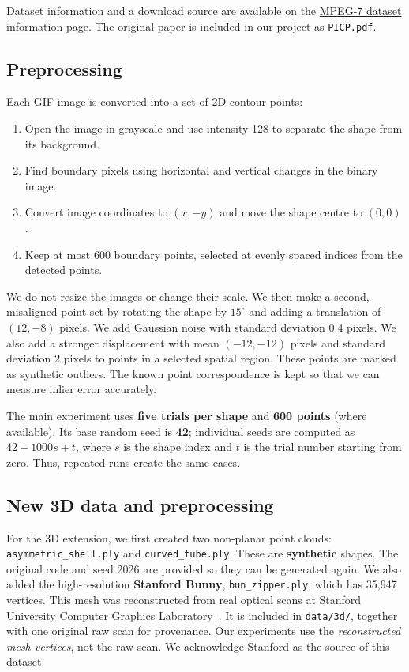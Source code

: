 \documentclass[11pt,a4paper]{article}
\begin{document}
Dataset information and a download source are available on the
\href{https://www.ehu.eus/ccwintco/index.php/MPEG-7_Core_Experiment_CE-Shape-1_Test_Set._Benchmarking_image_database_for_shape_recognition_techniques}{MPEG-7 dataset information page}.
The original paper is included in our project as \texttt{PICP.pdf}.

\subsection{Preprocessing}
Each GIF image is converted into a set of 2D contour points:
\begin{enumerate}[leftmargin=*,itemsep=2pt]
  \item Open the image in grayscale and use intensity 128 to separate the shape from its background.
  \item Find boundary pixels using horizontal and vertical changes in the binary image.
  \item Convert image coordinates to $(x,-y)$ and move the shape centre to $(0,0)$.
  \item Keep at most 600 boundary points, selected at evenly spaced indices from the detected points.
\end{enumerate}
We do not resize the images or change their scale. We then make a second,
misaligned point set by rotating the shape by $15^\circ$ and adding a translation
of $(12,-8)$ pixels. We add Gaussian noise with standard deviation 0.4 pixels.
We also add a stronger displacement with mean $(-12,-12)$ pixels and standard
deviation 2 pixels to points in a selected spatial region. These points are
marked as synthetic outliers. The known point correspondence is kept so that
we can measure inlier error accurately.

The main experiment uses \textbf{five trials per shape} and \textbf{600 points}
(where available). Its base random seed is \textbf{42}; individual seeds are
computed as $42 + 1000s + t$, where $s$ is the shape index and $t$ is the
trial number starting from zero. Thus, repeated runs create the same cases.

\subsection{New 3D data and preprocessing}
For the 3D extension, we first created two non-planar point clouds:
\texttt{asymmetric\_shell.ply} and \texttt{curved\_tube.ply}. These are
\textbf{synthetic} shapes. The original code and seed 2026 are provided so they
can be generated again. We also added the high-resolution \textbf{Stanford
Bunny}, \texttt{bun\_zipper.ply}, which has 35,947 vertices. This mesh was
reconstructed from real optical scans at Stanford University Computer Graphics
Laboratory~\cite{stanfordrepo}. It is included in \texttt{data/3d/}, together
with one original raw scan for provenance. Our experiments use the
\emph{reconstructed mesh vertices}, not the raw scan. We acknowledge Stanford
as the source of this dataset.
\end{document}
